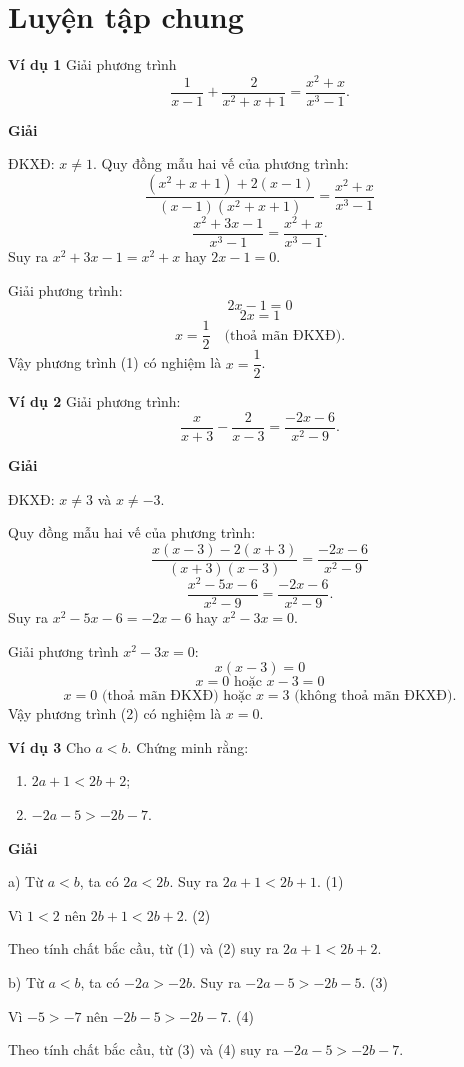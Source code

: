 
\section*{Luyện tập chung}

\begin{lesson}
    \textbf{Ví dụ 1} Giải phương trình
    \[
        \dfrac{1}{x-1}+\dfrac{2}{x^2+x+1}=\dfrac{x^2+x}{x^3-1}. \tag{1}
    \]

    \textbf{Giải}

    ĐKXĐ: $x\ne 1$. Quy đồng mẫu hai vế của phương trình:
    \[
        \dfrac{(x^2+x+1)+2(x-1)}{(x-1)(x^2+x+1)}
        =\dfrac{x^2+x}{x^3-1}
    \]
    \[
        \dfrac{x^2+3x-1}{x^3-1}=\dfrac{x^2+x}{x^3-1}.
    \]
    Suy ra $x^2+3x-1=x^2+x$ hay $2x-1=0$.

    Giải phương trình:
    \[
        2x-1=0
    \]
    \[
        2x=1
    \]
    \[
        x=\dfrac{1}{2}\quad\text{(thoả mãn ĐKXĐ)}.
    \]
    Vậy phương trình (1) có nghiệm là $x=\dfrac{1}{2}$.

    \textbf{Ví dụ 2} Giải phương trình:
    \[
        \dfrac{x}{x+3}-\dfrac{2}{x-3}=\dfrac{-2x-6}{x^2-9}. \tag{2}
    \]

    \textbf{Giải}

    ĐKXĐ: $x\ne 3$ và $x\ne -3$.

    Quy đồng mẫu hai vế của phương trình:
    \[
        \dfrac{x(x-3)-2(x+3)}{(x+3)(x-3)}
        =\dfrac{-2x-6}{x^2-9}
    \]
    \[
        \dfrac{x^2-5x-6}{x^2-9}=\dfrac{-2x-6}{x^2-9}.
    \]
    Suy ra $x^2-5x-6=-2x-6$ hay $x^2-3x=0$.

    Giải phương trình $x^2-3x=0$:
    \[
        x(x-3)=0
    \]
    \[
        x=0\text{ hoặc }x-3=0
    \]
    \[
        x=0\text{ (thoả mãn ĐKXĐ) hoặc }x=3\text{ (không thoả mãn ĐKXĐ)}.
    \]
    Vậy phương trình (2) có nghiệm là $x=0$.

    \textbf{Ví dụ 3} Cho $a<b$. Chứng minh rằng:
    \begin{enumerate}[label=\alph*)]
        \item $2a+1<2b+2$;
        \item $-2a-5>-2b-7$.
    \end{enumerate}

    \textbf{Giải}

    a) Từ $a<b$, ta có $2a<2b$. Suy ra $2a+1<2b+1$. \hfill (1)

    Vì $1<2$ nên $2b+1<2b+2$. \hfill (2)

    Theo tính chất bắc cầu, từ (1) và (2) suy ra $2a+1<2b+2$.

    b) Từ $a<b$, ta có $-2a>-2b$. Suy ra $-2a-5>-2b-5$. \hfill (3)

    Vì $-5>-7$ nên $-2b-5>-2b-7$. \hfill (4)

    Theo tính chất bắc cầu, từ (3) và (4) suy ra $-2a-5>-2b-7$.
\end{lesson}

